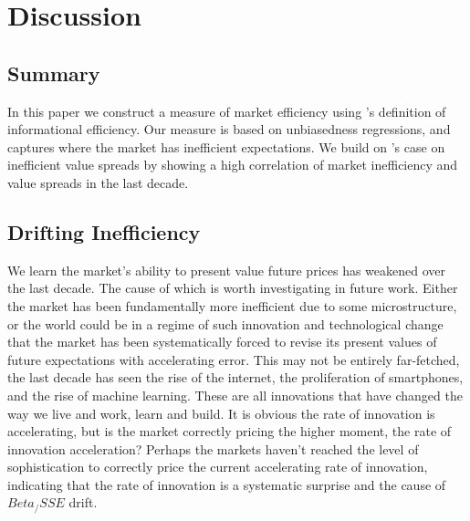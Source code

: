 \section{Discussion}
\label{sec:conclusion}
\subsection{Summary}
In this paper we construct a measure of market efficiency using \citet{fama_EMH}'s definition of informational efficiency. Our measure is based on unbiasedness
regressions, and captures where the market has inefficient expectations. We build on \citet{asness_2024}'s case on inefficient
value spreads by showing a high correlation of market inefficiency and value spreads in the last decade.

\subsection{Drifting Inefficiency}
We learn the market's ability to present value future prices has weakened over the last decade. The cause of which is worth investigating
in future work. Either the market has been fundamentally more inefficient due to some microstructure, or the world could be in a regime of such innovation and technological change that the market has been systematically forced to revise its
present values of future expectations with accelerating error. This may not be entirely far-fetched, the last decade has seen the rise of the internet,
the proliferation of smartphones, and the rise of machine learning. These are all innovations that have changed the way we live and work, learn and build.
It is obvious the rate of innovation is accelerating, but is the market correctly pricing the higher moment, the rate of innovation acceleration?
Perhaps the markets haven't reached the level of sophistication to correctly price the current accelerating rate of innovation, indicating that
the rate of innovation is a systematic surprise and the cause of $Beta_/SSE$ drift. 

